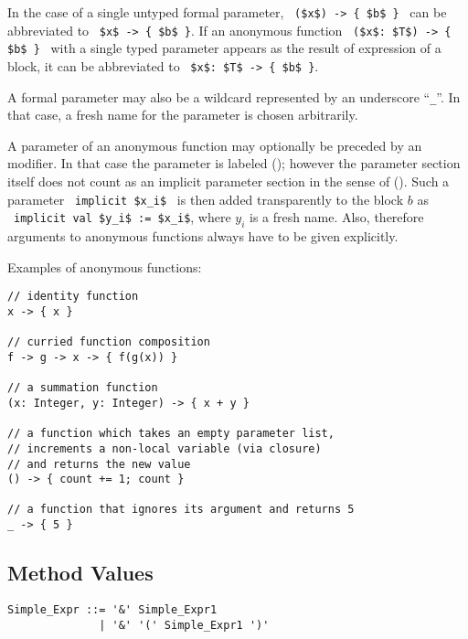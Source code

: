 In the case of a single untyped formal parameter, ~\lstinline!($x$) -> { $b$ }!~ can be abbreviated to ~\lstinline!$x$ -> { $b$ }!. If an anonymous function ~\lstinline!($x$: $T$) -> { $b$ }!~ with a single typed parameter appears as the result of expression of a block, it can be abbreviated to ~\lstinline!$x$: $T$ -> { $b$ }!.

A formal parameter may also be a wildcard represented by an underscore ``\lstinline!_!''. In that case, a fresh name for the parameter is chosen arbitrarily. 

A parameter of an anonymous function may optionally be preceded by an  modifier. In that case the parameter is labeled  (); however the parameter section itself does not count as an implicit parameter section in the sense of (). Such a parameter ~\lstinline!implicit $x_i$!~ is then added transparently to the block $b$ as ~\lstinline!implicit val $y_i$ := $x_i$!, where $y_i$ is a fresh name. Also, therefore arguments to anonymous functions always have to be given explicitly. 

\example Examples of anonymous functions:
\begin{lstlisting}
// identity function
x -> { x }

// curried function composition
f -> g -> x -> { f(g(x)) }

// a summation function
(x: Integer, y: Integer) -> { x + y }

// a function which takes an empty parameter list,
// increments a non-local variable (via closure)
// and returns the new value
() -> { count += 1; count }

// a function that ignores its argument and returns 5
_ -> { 5 }
\end{lstlisting}







\subsection{Method Values}
\label{sec:method-values}

\syntax\begin{lstlisting}
Simple_Expr ::= '&' Simple_Expr1
              | '&' '(' Simple_Expr1 ')'
\end{lstlisting}

